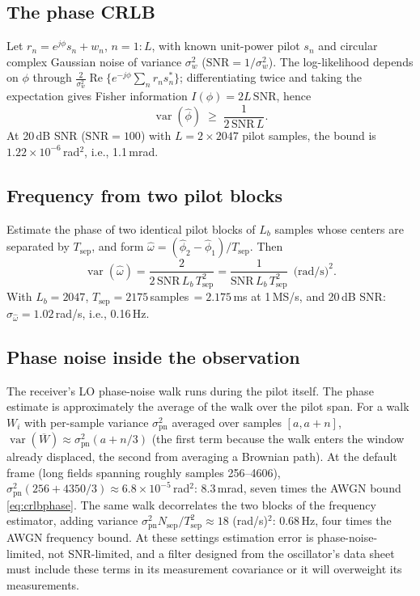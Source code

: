 \documentclass[10pt]{article}
\begin{document}
\subsection{The phase CRLB}
Let $r_n = e^{j\phi}s_n + w_n$, $n=1{:}L$, with known unit-power pilot
$s_n$ and circular complex Gaussian noise of variance $\sigma_w^2$
($\mathrm{SNR}=1/\sigma_w^2$). The log-likelihood depends on $\phi$
through $\tfrac{2}{\sigma_w^2}\operatorname{Re}\{e^{-j\phi}\sum_n r_n
s_n^*\}$; differentiating twice and taking the expectation gives Fisher
information $I(\phi)=2L\,\mathrm{SNR}$, hence
\begin{equation}
\operatorname{var}(\hat\phi)\;\ge\;\frac{1}{2\,\mathrm{SNR}\,L}.
\label{eq:crlbphase}
\end{equation}
At 20\,dB SNR ($\mathrm{SNR}=100$) with $L=2\times2047$ pilot samples,
the bound is $1.22\times10^{-6}$\,rad$^2$, i.e., 1.1\,mrad.

\subsection{Frequency from two pilot blocks}
Estimate the phase of two identical pilot blocks of $L_b$ samples whose
centers are separated by $T_{\mathrm{sep}}$, and form
$\hat\omega=(\hat\phi_2-\hat\phi_1)/T_{\mathrm{sep}}$. Then
\begin{equation}
\operatorname{var}(\hat\omega)=\frac{2}{2\,\mathrm{SNR}\,L_b\,T_{\mathrm{sep}}^2}
=\frac{1}{\mathrm{SNR}\,L_b\,T_{\mathrm{sep}}^2}\ \ \text{(rad/s)}^2 .
\label{eq:crlbfreq}
\end{equation}
With $L_b=2047$, $T_{\mathrm{sep}}=2175$\,samples\,$=2.175$\,ms at
1\,MS/s, and 20\,dB SNR: $\sigma_{\hat\omega}=1.02$\,rad/s, i.e.,
0.16\,Hz.

\subsection{Phase noise inside the observation}
The receiver's LO phase-noise walk runs during the pilot itself. The
phase estimate is approximately the average of the walk over the pilot
span. For a walk $W_i$ with per-sample variance $\sigma_{\mathrm{pn}}^2$
averaged over samples $[a, a{+}n]$,
$\operatorname{var}(\overline{W})\approx\sigma_{\mathrm{pn}}^2(a+n/3)$
(the first term because the walk enters the window already displaced, the
second from averaging a Brownian path). At the default frame (long fields
spanning roughly samples 256--4606),
$\sigma_{\mathrm{pn}}^2(256+4350/3)\approx6.8\times10^{-5}$\,rad$^2$:
8.3\,mrad, seven times the AWGN bound \eqref{eq:crlbphase}. The same walk
decorrelates the two blocks of the frequency estimator, adding variance
$\sigma_{\mathrm{pn}}^2 N_{\mathrm{sep}}/T_{\mathrm{sep}}^2\approx18$
(rad/s)$^2$: 0.68\,Hz, four times the AWGN frequency bound. At these
settings estimation error is phase-noise-limited, not SNR-limited, and a
filter designed from the oscillator's data sheet must include these terms
in its measurement covariance or it will overweight its measurements.
\end{document}
